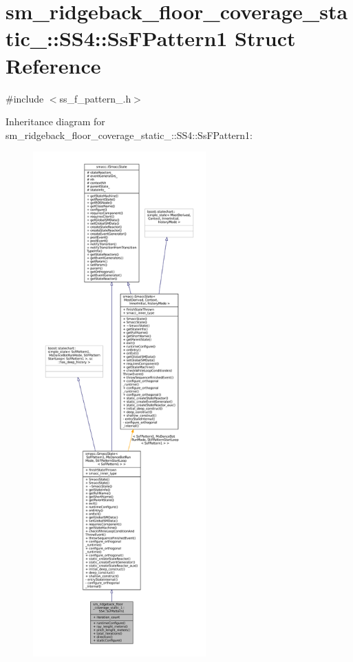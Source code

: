 \hypertarget{structsm__ridgeback__floor__coverage__static__1_1_1SS4_1_1SsFPattern1}{}\section{sm\+\_\+ridgeback\+\_\+floor\+\_\+coverage\+\_\+static\+\_\+:\+:S\+S4\+:\+:Ss\+F\+Pattern1 Struct Reference}
\label{structsm__ridgeback__floor__coverage__static__1_1_1SS4_1_1SsFPattern1}


{\ttfamily \#include $<$ss\+\_\+f\+\_\+pattern\+\_.\+h$>$}



Inheritance diagram for sm\+\_\+ridgeback\+\_\+floor\+\_\+coverage\+\_\+static\+\_\+:\+:S\+S4\+:\+:Ss\+F\+Pattern1\+:
\nopagebreak
\begin{figure}[H]
\begin{center}
\leavevmode
\includegraphics[height=550pt]{structsm__ridgeback__floor__coverage__static__1_1_1SS4_1_1SsFPattern1__inherit__graph}
\end{center}
\end{figure}


